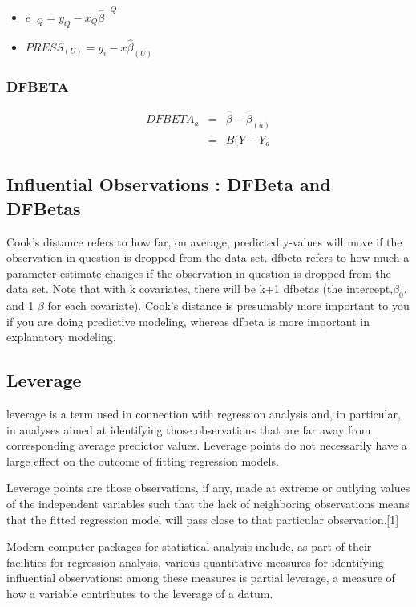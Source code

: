 \documentclass[residuals.tex]{subfiles}
\begin{document}
\begin{itemize}
	\item $e_{-Q} = y_{Q} - x_{Q}\hat{\beta}^{-Q}$
	\item $PRESS_{(U)} = y_{i} - x\hat{\beta}_{(U)}$
\end{itemize}

\subsubsection{DFBETA} %
\begin{eqnarray}
DFBETA_{a} &=& \hat{\beta} - \hat{\beta}_{(a)} \\
&=& B(Y-Y_{\bar{a}}
\end{eqnarray}
\newpage

\subsection{Influential Observations : DFBeta and DFBetas}
Cook's distance refers to how far, on average, predicted y-values will move if the observation in question is dropped from the data set. dfbeta refers to how much a parameter estimate changes if the observation in question is dropped from the data set. Note that with k covariates, there will be k+1 dfbetas (the intercept,$\beta_0$, and 1 $\beta$ for each covariate). Cook's distance is presumably more important to you if you are doing predictive modeling, whereas dfbeta is more important in explanatory modeling.


\subsection{Leverage}
leverage is a term used in connection with regression analysis and, in particular, in analyses aimed at identifying those observations that are far away from corresponding average predictor values. Leverage points do not necessarily have a large effect on the outcome of fitting regression models.

Leverage points are those observations, if any, made at extreme or outlying values of the independent variables such that the lack of neighboring observations means that the fitted regression model will pass close to that particular observation.[1]

Modern computer packages for statistical analysis include, as part of their facilities for regression analysis, various quantitative measures for identifying influential observations: among these measures is partial leverage, a measure of how a variable contributes to the leverage of a datum.
\end{document}
